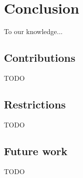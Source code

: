 \chapter{Conclusion}
\label{chap:conclusion}

To our knowledge...


\section{Contributions}

TODO


\section{Restrictions}

TODO


\section{Future work}

TODO
